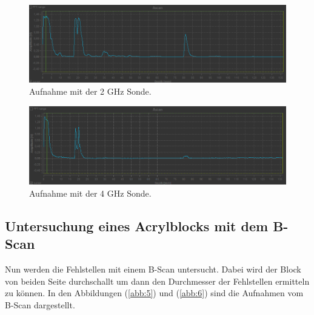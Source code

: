 \begin{figure}[H]
  \centering
  \includegraphics[width=\textwidth]{content/2MHz.png}
  \caption{Aufnahme mit der 2 GHz Sonde.}
  \label{abb:3}
\end{figure}

\begin{figure}[H]
  \centering
  \includegraphics[width=\textwidth]{content/4MHz.png}
  \caption{Aufnahme mit der 4 GHz Sonde.}
  \label{abb:4}
\end{figure}

\subsection{Untersuchung eines Acrylblocks mit dem B-Scan}
Nun werden die Fehlstellen mit einem B-Scan untersucht.
Dabei wird der Block von beiden Seite durchschallt um dann
den Durchmesser der Fehlstellen ermitteln zu können.
In den Abbildungen (\ref{abb:5}) und (\ref{abb:6}) sind die Aufnahmen
vom B-Scan dargestellt.

